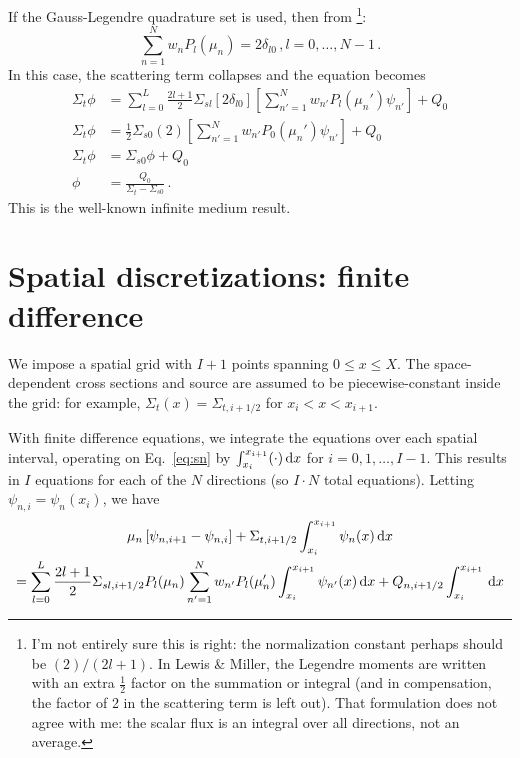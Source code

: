 \documentclass[]{SRJcommon}
\begin{document}
If the Gauss-Legendre quadrature set is used, then from
\cite[p.121]{Lew1984}\footnote{I'm not entirely sure this is right: the
normalization constant perhaps should be $(2)/(2l+1)$. In Lewis \& Miller,
the Legendre moments are written with an extra $\frac{1}{2}$ factor on the
summation or integral (and in compensation, the factor of 2 in the
scattering term is left out).  That formulation does not agree with me: the
scalar flux is an integral over all directions, not an average.}:
$$ \sum_{n=1}^{N} w_{n} P_{l}(\mu_n) = 2 \delta_{l0} \,, l = 0,\ldots, N-1 \,.$$
In this case, the scattering term collapses and the equation becomes
\begin{align*}
  \Sigma_t \phi 
  &= \sum_{l=0}^{L}  \frac{2l+1}{2} \Sigma_{sl} \left[ 2 \delta_{l0} \right] \left[ \sum_{n'=1}^{N} w_{n'} P_{l} (\mu_n') \psi_{n'}
\right] + Q_0
\\
  \Sigma_t \phi 
  &=  \frac{1}{2} \Sigma_{s0} (2) \left[ \sum_{n'=1}^{N} w_{n'} P_{0} (\mu_n') \psi_{n'}
\right] + Q_0
\\
\Sigma_t \phi 
  &=  \Sigma_{s0} \phi + Q_0
\\
\phi 
&=  \frac{Q_0}{\Sigma_t - \Sigma_{s0}} \,.
\end{align*}
This is the well-known infinite medium result.
\section{Spatial discretizations: finite difference}
We impose a spatial grid with $I+1$ points spanning $0 \le x \le X$. The
space-dependent cross sections and source are assumed to be piecewise-constant
inside the grid: for example, $\Sigma_t(x) = \Sigma_{t,i+1/2}$ for $x_{i} < x
< x_{i+1}$.

With finite difference equations, we integrate the \SN{} equations over each
spatial interval, operating on Eq.~\eqref{eq:sn} by $\int_{x_{i}}^{x_{i+1}}
(\cdot) \, \mathrm{d} x$ for $i = 0,1,\ldots, I-1$.
This results in $I$ equations for each of the $N$ directions (so $I \cdot N$
total equations). Letting $\psi_{n,i} = \psi_n(x_i)$, we have
\begin{multline}
  \mu_n \left[ \psi_{n,i+1} - \psi_{n,i} \right] + \Sigma_{t,i+1/2}
  \int_{x_{i}}^{x_{i+1}} \psi_n(x) \, \mathrm{d} x
\\
= \sum_{l=0}^{L}  \frac{2l+1}{2} \Sigma_{sl,i+1/2} P_{l}(\mu_n)
 \sum_{n'=1}^{N} w_{n'} P_{l} (\mu_n') \int_{x_{i}}^{x_{i+1}} \psi_{n'}(x) \, \mathrm{d} x
  + Q_{n,i+1/2} \int_{x_{i}}^{x_{i+1}} \, \mathrm{d} x
  \label{eq:finitediff}
\end{multline}
\end{document}
